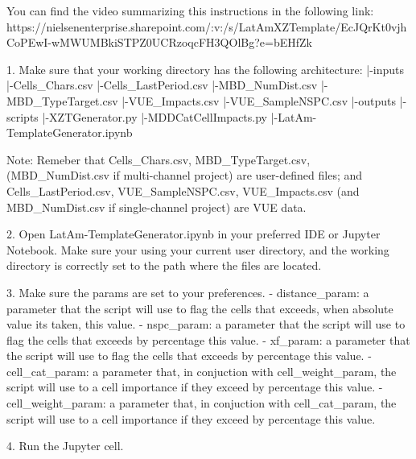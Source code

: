 You can find the video summarizing this instructions in the following link:
https://nielsenenterprise.sharepoint.com/:v:/s/LatAmXZTemplate/EcJQrKt0vjhCoPEwI-wMWUMBkiSTPZ0UCRzoqcFH3QOlBg?e=bEHfZk

1. Make sure that your working directory has the following architecture:
    |-inputs
        |-Cells_Chars.csv
        |-Cells_LastPeriod.csv
        |-MBD_NumDist.csv
        |-MBD_TypeTarget.csv
        |-VUE_Impacts.csv
        |-VUE_SampleNSPC.csv
    |-outputs
    |-scripts
        |-XZTGenerator.py
        |-MDDCatCellImpacts.py 
        |-LatAm-TemplateGenerator.ipynb

    Note: Remeber that Cells_Chars.csv, MBD_TypeTarget.csv, (MBD_NumDist.csv 
            if multi-channel project) are user-defined files; and 
            Cells_LastPeriod.csv, VUE_SampleNSPC.csv, VUE_Impacts.csv (and 
            MBD_NumDist.csv if single-channel project) are VUE data.


2. Open LatAm-TemplateGenerator.ipynb in your preferred IDE or Jupyter Notebook.
    Make sure your using your current user directory, and the working directory
    is correctly set to the path where the files are located.


3. Make sure the params are set to your preferences.
    - distance_param:    a parameter that the script will use to flag the cells that
                            exceeds, when absolute value its taken, this value.
    - nspc_param:        a parameter that the script will use to flag the cells that
                            exceeds by percentage this value.
    - xf_param:          a parameter that the script will use to flag the cells that
                            exceeds by percentage this value.
    - cell_cat_param:    a parameter that, in conjuction with cell_weight_param, 
                            the script will use to a cell importance if they exceed 
                            by percentage this value.
    - cell_weight_param: a parameter that, in conjuction with cell_cat_param, 
                            the script will use to a cell importance if they exceed 
                            by percentage this value.


4. Run the Jupyter cell.